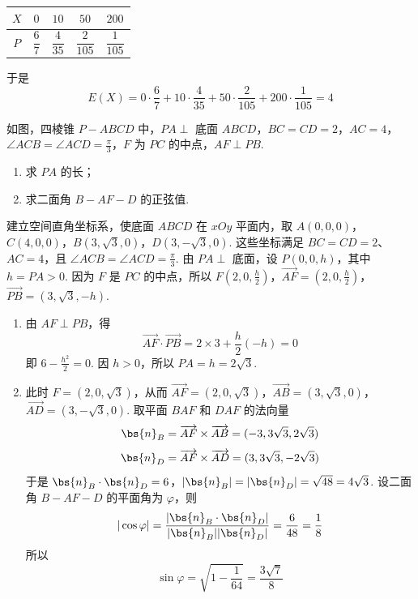 \begin{problem}
\begin{solution}
\begin{enumerate}
\begin{center}
\begin{tabular}{c|cccc}
\(X\) & \(0\) & \(10\) & \(50\) & \(200\) \\
\hline
\(P\) & \(\dfrac{6}{7}\) & \(\dfrac{4}{35}\) & \(\dfrac{2}{105}\) & \(\dfrac{1}{105}\)
\end{tabular}
\end{center}

于是
\[
E(X)=0\cdot\frac{6}{7}+10\cdot\frac{4}{35}+50\cdot\frac{2}{105}+200\cdot\frac{1}{105}=4
\]
\end{enumerate}
\end{solution}

\end{problem}

\begin{problem}
如图，四棱锥 \(P - ABCD\) 中，\(PA \perp\) 底面 \(ABCD\)，\(BC = CD = 2\)，\(AC = 4\)，\(\angle ACB = \angle ACD = \frac{\pi}{3}\)，\(F\) 为 \(PC\) 的中点，\(AF \perp PB\).

\begin{enumerate}
\item 求 \(PA\) 的长；
\item 求二面角 \(B - AF - D\) 的正弦值.
\end{enumerate}


\begin{solution}
建立空间直角坐标系，使底面 \(ABCD\) 在 \(xOy\) 平面内，取
\(A(0,0,0)\)，\(C(4,0,0)\)，\(B(3,\sqrt{3},0)\)，\(D(3,-\sqrt{3},0)\).
这些坐标满足 \(BC=CD=2\)、\(AC=4\)，且 \(\angle ACB=\angle ACD=\frac{\pi}{3}\). 由 \(PA\perp\) 底面，设 \(P(0,0,h)\)，其中 \(h=PA>0\). 因为 \(F\) 是 \(PC\) 的中点，所以
\(F\left(2,0,\frac{h}{2}\right)\)，\(\overrightarrow{AF}=\left(2,0,\frac{h}{2}\right)\)，\(\overrightarrow{PB}=(3,\sqrt{3},-h)\).

\begin{enumerate}
\item 由 \(AF\perp PB\)，得
\[
\overrightarrow{AF}\cdot\overrightarrow{PB}=2\times3+\frac{h}{2}(-h)=0
\]
即 \(6-\frac{h^{2}}{2}=0\). 因 \(h>0\)，所以 \(PA=h=2\sqrt{3}\).

\item 此时 \(F=(2,0,\sqrt{3})\)，从而
\(\overrightarrow{AF}=(2,0,\sqrt{3})\)，\(\overrightarrow{AB}=(3,\sqrt{3},0)\)，\(\overrightarrow{AD}=(3,-\sqrt{3},0)\).
取平面 \(BAF\) 和 \(DAF\) 的法向量
\[
\bs{n}_B=\overrightarrow{AF}\times\overrightarrow{AB}=(-3,3\sqrt{3},2\sqrt{3})
\]
\[
\bs{n}_D=\overrightarrow{AF}\times\overrightarrow{AD}=(3,3\sqrt{3},-2\sqrt{3})
\]
于是
\(\bs{n}_B\cdot\bs{n}_D=6\)，\(|\bs{n}_B|=|\bs{n}_D|=\sqrt{48}=4\sqrt{3}\).
设二面角 \(B-AF-D\) 的平面角为 \(\varphi\)，则
\[
|\cos\varphi|=\frac{|\bs{n}_B\cdot\bs{n}_D|}{|\bs{n}_B||\bs{n}_D|}=\frac{6}{48}=\frac18
\]
所以
\[
\sin\varphi=\sqrt{1-\frac{1}{64}}=\frac{3\sqrt{7}}{8}
\]
\end{enumerate}
\end{solution}

\end{problem}


